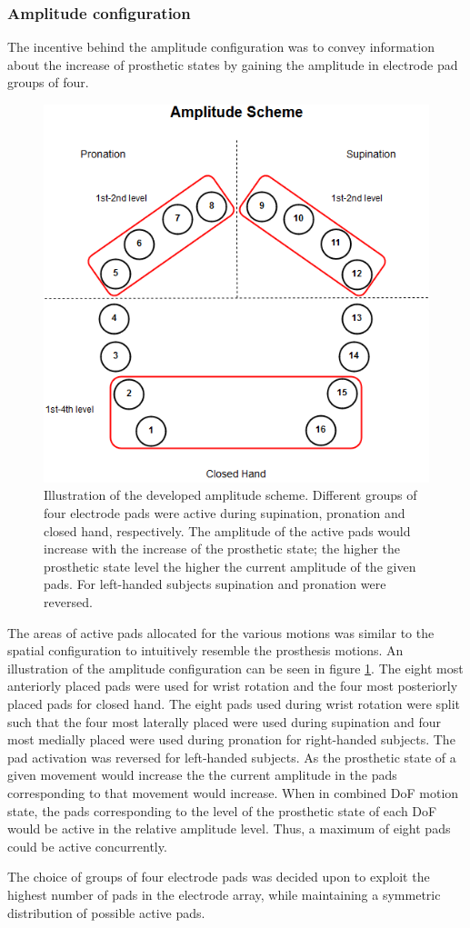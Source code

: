 \subsubsection{Amplitude configuration}
The incentive behind the amplitude configuration was to convey information about the increase of prosthetic states by gaining the amplitude in electrode pad groups of four.
 \begin{figure}[h]                 
	\includegraphics[width=.8\textwidth]{figures/El_array_amplitude}  
	\caption{Illustration of the developed amplitude scheme. Different groups of four electrode pads were active during supination, pronation and closed hand, respectively. The amplitude of the active pads would increase with the increase of the prosthetic state; the higher the prosthetic state level the higher the current amplitude of the given pads. For left-handed subjects supination and pronation were reversed.}
	\label{fig:pa:amplitude} 
\end{figure}


The areas of active pads allocated for the various motions was similar to the spatial configuration to intuitively resemble the prosthesis motions. An illustration of the amplitude configuration can be seen in figure \ref{fig:pa:amplitude}. The eight most anteriorly placed pads were used for wrist rotation and the four most posteriorly placed pads for closed hand. The eight pads used during wrist rotation were split such that the four most laterally placed were used during supination and four most medially placed were used during pronation for right-handed subjects. The pad activation was reversed for left-handed subjects. As the prosthetic state of a given movement would increase the the current amplitude in the pads corresponding to that movement would increase. When in combined DoF motion state, the pads corresponding to the level of the prosthetic state of each DoF would be active in the relative amplitude level. Thus, a maximum of eight pads could be active concurrently. 

The choice of groups of four electrode pads was decided upon to exploit the highest number of pads in the electrode array, while maintaining a symmetric distribution of possible active pads.



